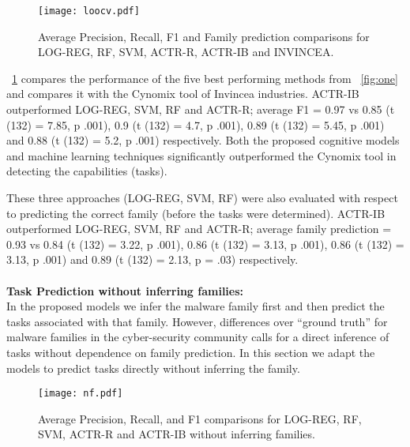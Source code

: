\documentclass[conference]{IEEEtran}
\begin{document}
\begin{figure}[htp!]
	\centerline{\texttt{[image: loocv.pdf]}}
	\vspace{0em}
	\caption{\textmd{Average Precision, Recall, F1 and Family prediction comparisons for LOG-REG, RF, SVM,  ACTR-R, ACTR-IB and INVINCEA.}}
	\vspace{-1em}
	\label{fig:two}
\end{figure}
\figurename~\ref{fig:two} compares the performance of the five best performing methods from \figurename~\ref{fig:one} and compares it with the Cynomix tool of Invincea industries. ACTR-IB outperformed LOG-REG, SVM, RF and ACTR-R; average F1 = 0.97 vs 0.85 (t (132) = 7.85,   p  .001), 0.9 (t (132) = 4.7, p  .001),  0.89 (t (132) = 5.45,   p  .001) and 0.88 (t (132) = 5.2, p  .001) respectively. Both the proposed cognitive models and machine learning techniques significantly outperformed the Cynomix tool in detecting the capabilities (tasks).

These three approaches (LOG-REG, SVM, RF) were also evaluated with respect to predicting the correct family (before the tasks were determined). ACTR-IB outperformed LOG-REG, SVM, RF and ACTR-R; average family prediction = 0.93 vs 0.84 (t (132) = 3.22,   p  .001), 0.86 (t (132) = 3.13, p  .001),  0.86 (t (132) = 3.13,   p  .001) and 0.89 (t (132) = 2.13, p = .03) respectively.\\\\
{\bf Task Prediction without inferring families:}\\
In the proposed models we infer the malware family first and then predict the tasks associated with that family. However, differences over ``ground truth'' for malware families in the cyber-security community calls for a direct inference of tasks without dependence on family prediction. In this section we adapt the models to predict tasks directly without inferring the family. 
\begin{figure}[htp!]
	\centerline{\texttt{[image: nf.pdf]}}
	\vspace{0em}
	\caption{\textmd{Average Precision, Recall, and F1 comparisons for LOG-REG, RF, SVM,  ACTR-R and ACTR-IB without inferring families.}}
	\vspace{-1em}
	\label{fig:nf}
\end{figure}
\end{document}
